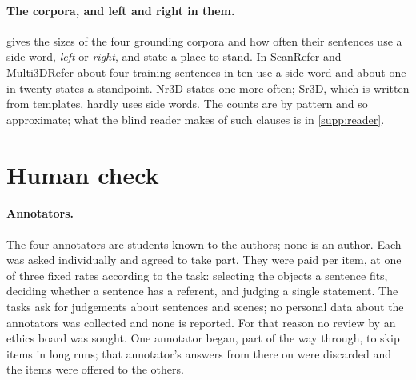 \paragraph{The corpora, and left and right in them.}
 gives the sizes of the four grounding corpora and how often their sentences use a side word, \emph{left} or \emph{right}, and state a place to stand.
In ScanRefer and Multi3DRefer about four training sentences in ten use a side word and about one in twenty states a standpoint.
Nr3D states one more often; Sr3D, which is written from templates, hardly uses side words.
The counts are by pattern and so approximate; what the blind reader makes of such clauses is in \cref{supp:reader}.


\section{Human check}
\label{supp:human}
\paragraph{Annotators.}
The four annotators are students known to the authors; none is an author.
Each was asked individually and agreed to take part.
They were paid per item, at one of three fixed rates according to the task: selecting the objects a sentence fits, deciding whether a sentence has a referent, and judging a single statement.
The tasks ask for judgements about sentences and scenes; no personal data about the annotators was collected and none is reported.
For that reason no review by an ethics board was sought.
One annotator began, part of the way through, to skip items in long runs; that annotator's answers from there on were discarded and the items were offered to the others.

